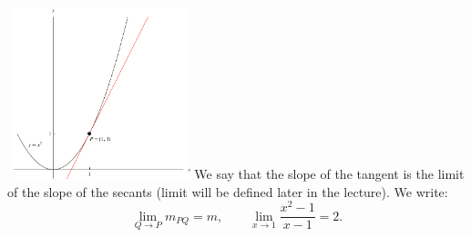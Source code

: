 \begin{frame}
\begin{columns}[c]
\  \includegraphics[height=5cm]{limits/pictures/02-01-secanta.pdf}%
We say that the slope of the tangent is the limit of the slope of the secants (limit will be defined later in the lecture).  We write:
\[
\lim_{Q\rightarrow P} m_{PQ} = m, \qquad \lim_{x\rightarrow 1}\frac{x^2 - 1}{x - 1} = 2 .
\]
\end{columns}
\end{frame}
